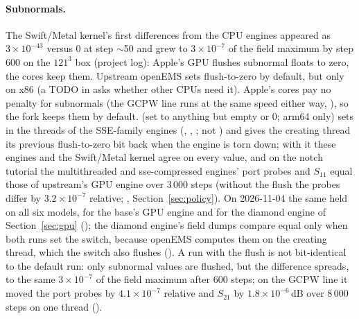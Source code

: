 \paragraph{Subnormals.} The Swift/Metal kernel's first differences from the CPU engines appeared as $3\times10^{-43}$
versus 0 at step $\sim$50 and grew to $3\times10^{-7}$ of the field maximum by step 600 on the $121^3$ box (project log):
Apple's GPU flushes subnormal floats to zero, the cores keep them. Upstream openEMS sets flush-to-zero by default, but
only on x86 (a TODO in  asks whether other CPUs need it). Apple's cores pay no penalty for
subnormals (the GCPW line runs at the same speed either way, ), so the
fork keeps them by default.  (set to anything but empty or 0; arm64 only) sets 
in the threads of the SSE-family engines (, , ; not )
and gives the creating thread its previous flush-to-zero bit back when the engine is torn down; with it these engines
and the Swift/Metal kernel agree on every value, and on the notch tutorial the multithreaded and sse-compressed
engines' port probes and $S_{11}$ equal those of upstream's GPU engine over 3\,000 steps (without the flush the
probes differ by $3.2\times10^{-7}$ relative; , Section~\ref{sec:policy}).
On 2026-11-04 the same held on all six models, for the base's GPU engine and for the diamond engine of
Section~\ref{sec:gpu} (); the diamond engine's field dumps compare equal only when both
runs set the switch, because openEMS computes them on the creating thread, which the switch also flushes
(). A run with the flush is not bit-identical to the default run:
only subnormal values are flushed, but the difference spreads, to the
same $3\times10^{-7}$ of the field maximum after 600 steps; on the GCPW line it moved the port probes by
$4.1\times10^{-7}$ relative and $S_{21}$ by $1.8\times10^{-6}$\,dB over 8\,000 steps on one thread
().
